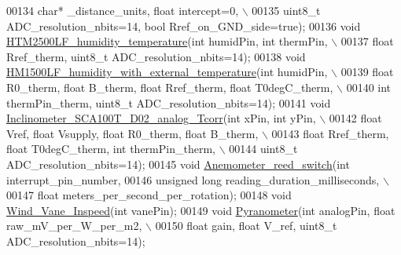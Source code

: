 \begin{DoxyCode}
00134          \textcolor{keywordtype}{char}* \_distance\_units, \textcolor{keywordtype}{float} intercept=0, \(\backslash\)
00135          uint8\_t ADC\_resolution\_nbits=14, \textcolor{keywordtype}{bool} Rref\_on\_GND\_side=\textcolor{keyword}{true});
00136     \textcolor{keywordtype}{void} \hyperlink{classLogger_a4ccff7a14a6bddc8bb28e22b3b36d3cc}{HTM2500LF\_humidity\_temperature}(\textcolor{keywordtype}{int} humidPin, \textcolor{keywordtype}{int} thermPin, \(\backslash\)
00137          \textcolor{keywordtype}{float} Rref\_therm, uint8\_t ADC\_resolution\_nbits=14);
00138     \textcolor{keywordtype}{void} \hyperlink{classLogger_a62b74ddb3cf9fdd7dae2394c1b245ed4}{HM1500LF\_humidity\_with\_external\_temperature}(\textcolor{keywordtype}{int} 
      humidPin, \(\backslash\)
00139          \textcolor{keywordtype}{float} R0\_therm, \textcolor{keywordtype}{float} B\_therm, \textcolor{keywordtype}{float} Rref\_therm, \textcolor{keywordtype}{float} T0degC\_therm, \(\backslash\)
00140          \textcolor{keywordtype}{int} thermPin\_therm, uint8\_t ADC\_resolution\_nbits=14);
00141     \textcolor{keywordtype}{void} \hyperlink{classLogger_a80fdea5a339573980f9544ac64678411}{Inclinometer\_SCA100T\_D02\_analog\_Tcorr}(\textcolor{keywordtype}{int} xPin, \textcolor{keywordtype}{int} yPin, \(\backslash\)
00142          \textcolor{keywordtype}{float} Vref, \textcolor{keywordtype}{float} Vsupply, \textcolor{keywordtype}{float} R0\_therm, \textcolor{keywordtype}{float} B\_therm, \(\backslash\)
00143          \textcolor{keywordtype}{float} Rref\_therm, \textcolor{keywordtype}{float} T0degC\_therm, \textcolor{keywordtype}{int} thermPin\_therm, \(\backslash\)
00144          uint8\_t ADC\_resolution\_nbits=14);
00145     \textcolor{keywordtype}{void} \hyperlink{classLogger_a6c6a43a1b86f88c2a5e33d14c992e510}{Anemometer\_reed\_switch}(\textcolor{keywordtype}{int} interrupt\_pin\_number, 
00146          \textcolor{keywordtype}{unsigned} \textcolor{keywordtype}{long} reading\_duration\_milliseconds, \(\backslash\)
00147          \textcolor{keywordtype}{float} meters\_per\_second\_per\_rotation);
00148     \textcolor{keywordtype}{void} \hyperlink{classLogger_a31c3cba5ff5722fb66bf540bfbe8b25d}{Wind\_Vane\_Inspeed}(\textcolor{keywordtype}{int} vanePin);
00149     \textcolor{keywordtype}{void} \hyperlink{classLogger_ae4190ce7ccfd7b148a6151102a3bf93d}{Pyranometer}(\textcolor{keywordtype}{int} analogPin, \textcolor{keywordtype}{float} raw\_mV\_per\_W\_per\_m2, \(\backslash\)
00150          \textcolor{keywordtype}{float} gain, \textcolor{keywordtype}{float} V\_ref, uint8\_t ADC\_resolution\_nbits=14);

\end{DoxyCode}
